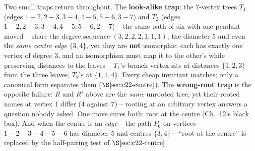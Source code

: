 Two small traps return throughout.  The \textbf{look-alike trap}: the 7-vertex
trees \(T_1\) (edges \(1\!-\!2,2\!-\!3,3\!-\!4,4\!-\!5,5\!-\!6,3\!-\!7\)) and
\(T_2\) (edges \(1\!-\!2,2\!-\!3,3\!-\!4,4\!-\!5,5\!-\!6,2\!-\!7\)) -- the same
path of six with one pendant moved -- share the degree sequence
\((3,2,2,2,1,1,1)\), the diameter \(5\) and even the \emph{same centre edge}
\(\{3,4\}\), yet they are \textbf{not} isomorphic: each has exactly one
vertex of degree \(3\), and an isomorphism must map it to the other's while
preserving distances to the leaves -- \(T_1\)'s branch vertex sits at distances
\(\{1,2,3\}\) from the three leaves, \(T_2\)'s at \(\{1,1,4\}\).  Every cheap
invariant matches; only a canonical form separates them
(\(\secref{c22-centre}\)).  The \textbf{wrong-root trap} is the opposite
failure: \(R\) and \(R'\) above are the \emph{same} unrooted tree, yet their
rooted names at vertex \(1\) differ (\(4\) against \(7\)) -- rooting at an
arbitrary vertex answers a question nobody asked.  One move cures both: root at
the centre (Ch.~12's black box).  And when the centre is an \emph{edge} -- the
path \(P_6\) on vertices \(1\!-\!2\!-\!3\!-\!4\!-\!5\!-\!6\) has diameter \(5\)
and centres \(\{3,4\}\) -- ``root at the centre'' is replaced by the half-pairing
test of \(\secref{c22-centre}\).

